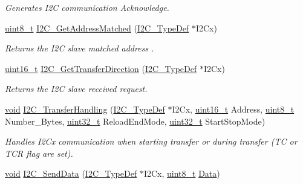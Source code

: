 \begin{DoxyCompactItemize}
\begin{DoxyCompactList}\small\item\em Generates I2\-C communication Acknowledge. \end{DoxyCompactList}\item 
\hyperlink{stdint_8h_aba7bc1797add20fe3efdf37ced1182c5}{uint8\-\_\-t} \hyperlink{group___i2_c___group2_ga1439265db210aefd275838f8ffb167b3}{I2\-C\-\_\-\-Get\-Address\-Matched} (\hyperlink{struct_i2_c___type_def}{I2\-C\-\_\-\-Type\-Def} $\ast$I2\-Cx)
\begin{DoxyCompactList}\small\item\em Returns the I2\-C slave matched address . \end{DoxyCompactList}\item 
\hyperlink{stdint_8h_a273cf69d639a59973b6019625df33e30}{uint16\-\_\-t} \hyperlink{group___i2_c___group2_ga9e4d5fcc43d19b725a7999734801b5f3}{I2\-C\-\_\-\-Get\-Transfer\-Direction} (\hyperlink{struct_i2_c___type_def}{I2\-C\-\_\-\-Type\-Def} $\ast$I2\-Cx)
\begin{DoxyCompactList}\small\item\em Returns the I2\-C slave received request. \end{DoxyCompactList}\item 
\hyperlink{group___n_a_m_e_ga18028b8badbf1ea7e704ccac3c488e82}{void} \hyperlink{group___i2_c___group2_ga4ea3fec0b966564f8d45e5620384a96a}{I2\-C\-\_\-\-Transfer\-Handling} (\hyperlink{struct_i2_c___type_def}{I2\-C\-\_\-\-Type\-Def} $\ast$I2\-Cx, \hyperlink{stdint_8h_a273cf69d639a59973b6019625df33e30}{uint16\-\_\-t} Address, \hyperlink{stdint_8h_aba7bc1797add20fe3efdf37ced1182c5}{uint8\-\_\-t} Number\-\_\-\-Bytes, \hyperlink{stdint_8h_a435d1572bf3f880d55459d9805097f62}{uint32\-\_\-t} Reload\-End\-Mode, \hyperlink{stdint_8h_a435d1572bf3f880d55459d9805097f62}{uint32\-\_\-t} Start\-Stop\-Mode)
\begin{DoxyCompactList}\small\item\em Handles I2\-Cx communication when starting transfer or during transfer (T\-C or T\-C\-R flag are set). \end{DoxyCompactList}\item 
\hyperlink{group___n_a_m_e_ga18028b8badbf1ea7e704ccac3c488e82}{void} \hyperlink{group___i2_c___group2_ga7bd9e70b8eafde0dd5eb42b0d95fe1a9}{I2\-C\-\_\-\-Send\-Data} (\hyperlink{struct_i2_c___type_def}{I2\-C\-\_\-\-Type\-Def} $\ast$I2\-Cx, \hyperlink{stdint_8h_aba7bc1797add20fe3efdf37ced1182c5}{uint8\-\_\-t} \hyperlink{group___copter_control_b_l_ga6f3335509cc4943e20df66f72483910c}{Data})

\end{DoxyCompactItemize}
